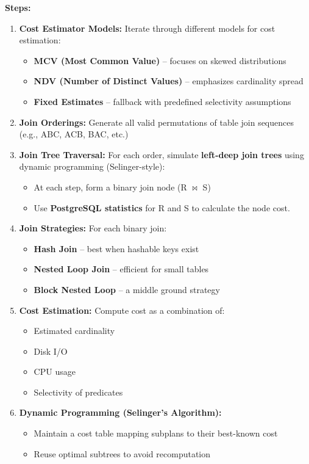 \documentclass[12pt]{article}
\begin{document}
\textbf{Steps:}
\begin{enumerate}
  \item \textbf{Cost Estimator Models:} Iterate through different models for cost estimation:
  \begin{itemize}
    \item \textbf{MCV (Most Common Value)} – focuses on skewed distributions
    \item \textbf{NDV (Number of Distinct Values)} – emphasizes cardinality spread
    \item \textbf{Fixed Estimates} – fallback with predefined selectivity assumptions
  \end{itemize}
  
  \item \textbf{Join Orderings:} Generate all valid permutations of table join sequences (e.g., ABC, ACB, BAC, etc.)
  
  \item \textbf{Join Tree Traversal:} For each order, simulate \textbf{left-deep join trees} using dynamic programming (Selinger-style):
  
  \begin{itemize}
    \item At each step, form a binary join node (R $\bowtie$ S)
    \item Use \textbf{PostgreSQL statistics} for R and S to calculate the node cost. 
  \end{itemize}
  
  \item \textbf{Join Strategies:} For each binary join:
  \begin{itemize}
    \item \textbf{Hash Join} – best when hashable keys exist
    \item \textbf{Nested Loop Join} – efficient for small tables
    \item \textbf{Block Nested Loop} – a middle ground strategy
  \end{itemize}

  \item \textbf{Cost Estimation:} Compute cost as a combination of:
  \begin{itemize}
    \item Estimated cardinality
    \item Disk I/O
    \item CPU usage
    \item Selectivity of predicates
  \end{itemize}

  \item \textbf{Dynamic Programming (Selinger's Algorithm):}
  \begin{itemize}
    \item Maintain a cost table mapping subplans to their best-known cost
    \item Reuse optimal subtrees to avoid recomputation
  \end{itemize}
\end{enumerate}
\end{document}
